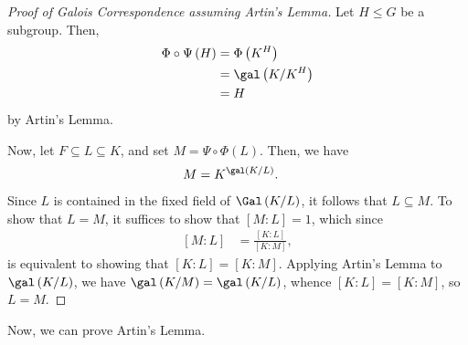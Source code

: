 \documentclass[10pt]{mypackage}
\begin{document}
\begin{proof}[Proof of Galois Correspondence assuming Artin's Lemma]
  Let $H\leq G$ be a subgroup. Then,
  \begin{align*}
    \Phi\circ\Psi\left( H \right) &= \Phi\left( K^{H} \right)\\
                                  &= \gal\left( K/K^{H} \right)\\
                                  &= H
  \end{align*}
  by Artin's Lemma.

  Now, let $F\subseteq L\subseteq K$, and set $M = \Psi\circ\Phi\left( L \right)$. Then, we have
  \begin{align*}
    M &= K^{\gal\left( K/L \right)}.
  \end{align*}
  Since $L$ is contained in the fixed field of $\Gal\left( K/L \right)$, it follows that $L\subseteq M$. To show that $L = M$, it suffices to show that $\left[ M:L \right] = 1$, which since
  \begin{align*}
    \left[ M:L \right] &= \frac{\left[ K:L \right]}{\left[ K:M \right]},
  \end{align*}
  is equivalent to showing that $\left[ K:L \right] = \left[ K:M \right]$. Applying Artin's Lemma to $\gal\left( K/L \right)$, we have $\gal\left( K/M \right) = \gal\left( K/L \right)$, whence $\left[ K:L \right] = \left[ K:M \right]$, so $L = M$.
\end{proof}
Now, we can prove Artin's Lemma.
\end{document}
